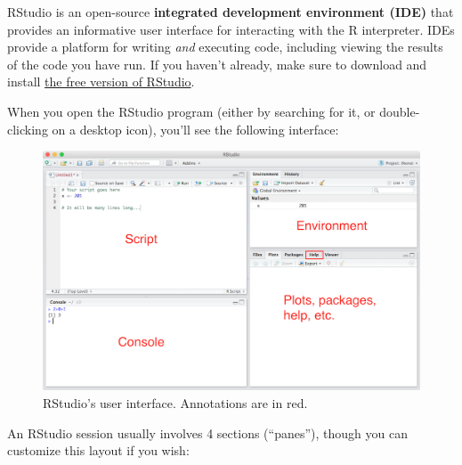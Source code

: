 \documentclass[]{book}
\theoremstyle{definition}
\theoremstyle{definition}
\theoremstyle{remark}
\begin{document}
RStudio is an open-source \textbf{integrated development environment
(IDE)} that provides an informative user interface for interacting with
the R interpreter. IDEs provide a platform for writing \emph{and}
executing code, including viewing the results of the code you have run.
If you haven't already, make sure to download and install
\href{https://www.rstudio.com/products/rstudio/download3/\#download}{the
free version of RStudio}.

When you open the RStudio program (either by searching for it, or
double-clicking on a desktop icon), you'll see the following interface:

\begin{figure}
\centering
\includegraphics{img/r-intro/rstudio-interface.png}
\caption{RStudio's user interface. Annotations are in red.}
\end{figure}

An RStudio session usually involves 4 sections (``panes''), though you
can customize this layout if you wish:
\end{document}
